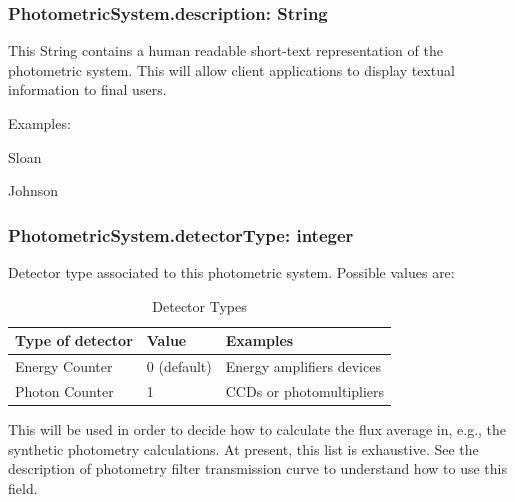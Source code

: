 \documentclass[11pt,a4paper]{ivoa}
\begin{document}
\subsubsection{PhotometricSystem.description: String}
This String contains a human readable short-text representation of the 
photometric system. This will allow client applications to display 
textual information to final users.
\par

Examples:


Sloan \par
Johnson
\bigskip



\subsubsection{PhotometricSystem.detectorType: integer}
Detector type associated to this photometric system. Possible 
values are:




\begin{table}[ht]
 			\centering
\begin{tabular}{p{2.42in}p{0.8in}p{1.55in}}
\hline
\multicolumn{1}{|p{2.42in}}{Type of detector} &
\multicolumn{1}{|p{0.8in}}{Value} &
\multicolumn{1}{|p{1.55in}|}{Examples} \\
\hline
\multicolumn{1}{|p{2.42in}}{Energy Counter} &
\multicolumn{1}{|p{0.8in}}{0 (default)} &
\multicolumn{1}{|p{1.55in}|}{Energy amplifiers devices} \\
\hline
\multicolumn{1}{|p{2.42in}}{Photon Counter} &
\multicolumn{1}{|p{0.8in}}{1} &
\multicolumn{1}{|p{1.55in}|}{CCDs or photomultipliers} \\
\hline
\end{tabular}
\caption{Detector Types}
 \end{table}



This will be used in order to decide how to calculate the 
flux average in, e.g., the synthetic photometry calculations. 
At present, this list is exhaustive. 
See the description of photometry filter 
transmission curve to understand how to use this field.
\par
\end{document}
